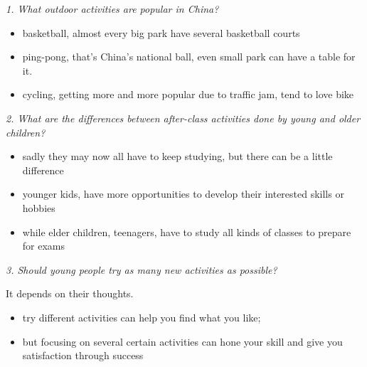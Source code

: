 \documentclass[conference]{IEEEtran}
\begin{document}
\textit{1. What outdoor activities are popular in China?}
\begin{itemize}
    \item basketball, almost every big park have several basketball courts
    \item ping-pong, that's China's national ball, even small park can have a table for it.
    \item cycling, getting more and more popular due to traffic jam, tend to love bike
\end{itemize}

\textit{2. What are the differences between after-class activities done by young and older children?}
\begin{itemize}
    \item sadly they may now all have to keep studying, but there can be a little difference
    \item younger kids, have more opportunities to develop their interested skills or hobbies
    \item while elder children, teenagers, have to study all kinds of classes to prepare for exams
\end{itemize}

\textit{3. Should young people try as many new activities as possible?}

It depends on their thoughts.
\begin{itemize}
    \item try different activities can help you find what you like;
    \item but focusing on several certain activities can hone your skill and give you satisfaction through success
\end{itemize}
\end{document}
